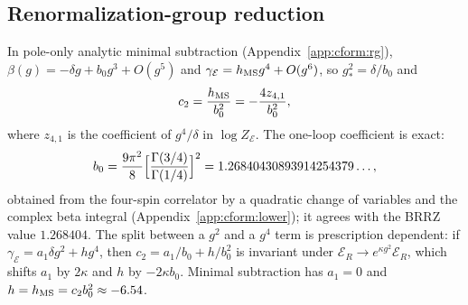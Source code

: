 \documentclass[11pt,a4paper]{article}
\numberwithin{equation}{section}
\newcommand{\hMS}{h_{\rm MS}}
\begin{document}
\subsection{Renormalization-group reduction}\label{sec:rg2}
In pole-only analytic minimal subtraction (Appendix~\ref{app:cform:rg}), $\beta(g)=-\delta g+b_0g^3+O(g^5)$ and
$\gamma_{\mathcal E}=\hMS g^4+O(g^6)$, so $g_*^2=\delta/b_0$ and
\begin{equation}
 c_2=\frac{\hMS}{b_0^2}=-\frac{4z_{4,1}}{b_0^2},
\end{equation}
where $z_{4,1}$ is the coefficient of $g^4/\delta$ in $\log Z_{\mathcal E}$. The one-loop coefficient is exact:
\begin{equation}
 b_0=\frac{9\pi^2}{8}\Bigl[\frac{\Gamma(3/4)}{\Gamma(1/4)}\Bigr]^2=1.26840430893914254379\ldots,
\end{equation}
obtained from the four-spin correlator by a quadratic change of variables and the complex beta integral
(Appendix~\ref{app:cform:lower}); it agrees
with the BRRZ value $1.268404$. The split between a $g^2$ and a $g^4$ term is prescription dependent: if
$\gamma_{\mathcal E}=a_1\delta g^2+hg^4$, then $c_2=a_1/b_0+h/b_0^2$ is invariant under
$\mathcal E_R\to e^{\kappa g^2}\mathcal E_R$, which shifts $a_1$ by $2\kappa$ and $h$ by $-2\kappa b_0$. Minimal
subtraction has $a_1=0$ and $h=\hMS=c_2b_0^2\approx-6.54$.
\end{document}
